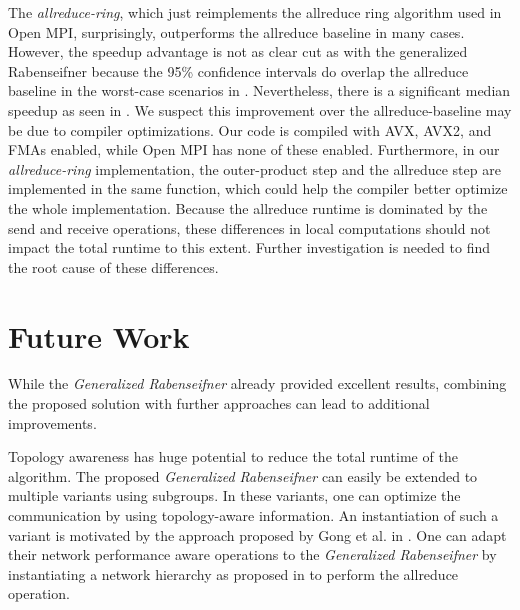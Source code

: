 \documentclass[letterpaper]{article}
\newcommand{\code}{\textit}
\newcommand{\grabenseifner}{\textit{Generalized Rabenseifner}}
\begin{document}
The \code{allreduce-ring}, which just reimplements the allreduce ring algorithm used in Open MPI, surprisingly, outperforms the allreduce baseline in many cases. However, the speedup advantage is not as clear cut as with the generalized Rabenseifner because the 95\% confidence intervals do overlap the allreduce baseline in the worst-case scenarios in . Nevertheless, there is a significant median speedup as seen in . We suspect this improvement over the allreduce-baseline may be due to compiler optimizations. Our code is compiled with AVX, AVX2, and FMAs enabled, while Open MPI has none of these enabled. Furthermore, in our \code{allreduce-ring} implementation, the outer-product step and the allreduce step are implemented in the same function, which could help the compiler better optimize the whole implementation. Because the allreduce runtime is dominated by the send and receive operations, these differences in local computations should not impact the total runtime to this extent. Further investigation is needed to find the root cause of these differences.


\section{Future Work}\label{sec:future_work}

While the \grabenseifner{} already provided excellent results, combining the proposed solution with further approaches can lead to additional improvements.


Topology awareness has huge potential to reduce the total runtime of the algorithm. The proposed \grabenseifner{} can easily be extended to multiple variants using subgroups. In these variants, one can optimize the communication by using topology-aware information. An instantiation of such a variant is motivated by the approach proposed by Gong et al. in \cite{network_performance_aware_collective_communication_operations_in_the_cloud}. One can adapt their network performance aware operations to the \grabenseifner{} by instantiating a network hierarchy as proposed in \cite{network_performance_aware_collective_communication_operations_in_the_cloud} to perform the allreduce operation.
\end{document}

